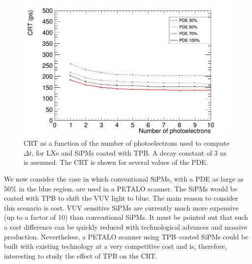 \documentclass[review]{elsarticle}
\begin{document}
\begin{figure}[!bhtp]
	\centering
	\includegraphics[scale=0.4]{../img/PetaloTOF/tpb_noCher_3d0ns_avg_npe_phys}
	\caption{\label{fig.crtTPB3ns} CRT as a function of the number of photoelectrons used to compute $\Delta t$, for LXe and SiPMs coated with TPB. A decay constant of 3 ns is assumed. The CRT is shown for several values of the PDE. }
\end{figure}


We now consider the case in which conventional SiPMs, with a PDE as large as 50\% in the blue region, are used in a PETALO scanner. The SiPMs would be coated with TPB to shift the VUV light to blue. The main reason to consider this scenario is cost. VUV sensitive SiPMs are currently much more expensive (up to a factor of 10) than conventional SiPMs. It must be pointed out that such a cost difference can be quickly reduced with technological advances and massive production. Nevertheless, a PETALO scanner using TPB--coated SiPMs could be built with existing technology at a very competitive cost and is, therefore, interesting to study the effect of TPB on the CRT.
\end{document}
